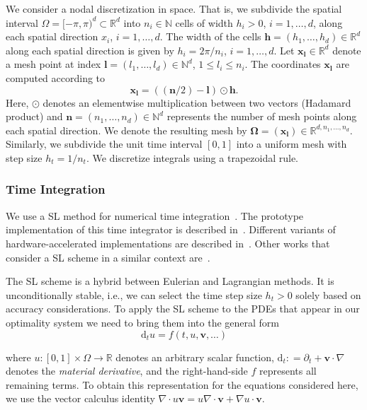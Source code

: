 \documentclass[11pt]{amsart}
\newcommand\di[1]{\ensuremath{\mathbf{#1}}}
\newcommand\igrad{\ensuremath{\nabla}}
\newcommand{\idiv}{\ensuremath{\nabla\cdot}}
\newcommand{\defeq}{\ensuremath{\mathrel{\mathop:}=}}
\renewcommand{\d}{\ensuremath{\text{d}}}
\renewcommand{\vec}[1]{\ensuremath{\boldsymbol{#1}}}
\begin{document}
We consider a nodal discretization in space. That is, we subdivide the spatial interval $\Omega = [-\pi,\pi)^d \subset \mathbb{R}^d$ into $n_i \in \mathbb{N}$ cells of width $h_i > 0$, $i=1,\ldots,d$, along each spatial direction $x_i$, $i=1,\ldots,d$. The width of the cells $\vec{h} = (h_1, \ldots, h_d) \in \mathbb{R}^d$ along each spatial direction is given by $h_i = 2 \pi / n_i$, $i = 1, \ldots, d$. Let $\vec{x}_{\vec{l}} \in \mathbb{R}^d$ denote a mesh point at index $\vec{l} = (l_1,\ldots,l_d) \in \mathbb{N}^d$, $1 \leq l_i \leq n_i$. The coordinates $\vec{x}_{\vec{l}}$ are computed according to \[\vec{x}_{\vec{l}} = ((\vec{n}/2) - \vec{l}) \odot \vec{h}.\] Here, $\odot$ denotes an elementwise multiplication between two vectors (Hadamard product) and $\vec{n} = (n_1, \ldots, n_d) \in \mathbb{N}^d$ represents the number of mesh points along each spatial direction. We denote the resulting mesh by $\di{\Omega} = (\di{x}_{\vec{l}}) \in \mathbb{R}^{d, n_1, \ldots, n_d}$. Similarly, we subdivide the unit time interval $[0,1]$ into a uniform mesh with step size $h_t = 1 / n_t$. We discretize integrals using a trapezoidal rule.




\subsubsection{Time Integration} We use a SL method for numerical time integration~\cite{Staniforth:1991a}. The prototype implementation of this time integrator is described in~\cite{Mang:2017b}. Different variants of hardware-accelerated implementations are described in~\cite{Mang:2016b,Brunn:2020a,Brunn:2021a}. Other works that consider a SL scheme in a similar context are~\cite{Franccois:2021a,Beg:2005a}.

The SL scheme is a hybrid between Eulerian and Lagrangian methods. It is unconditionally stable, i.e., we can select the time step size $h_t > 0$ solely based on accuracy considerations. To apply the SL scheme to the PDEs that appear in our optimality system we need to bring them into the general form
\begin{equation}\label{e:matderiv}
\d_t u = f(t,u, \vec{v}, \ldots)
\end{equation}

\noindent where $u : [0,1] \times \Omega \to \mathbb{R}$ denotes an arbitrary scalar function, $\d_t \defeq \partial_t + \vec{v} \cdot \igrad$ denotes the \emph{material derivative}, and the right-hand-side $f$ represents all remaining terms. To obtain this representation for the equations considered here, we use the vector calculus identity $\idiv u\vec{v} = u \idiv \vec{v} + \igrad u \cdot \vec{v}$.
\end{document}
